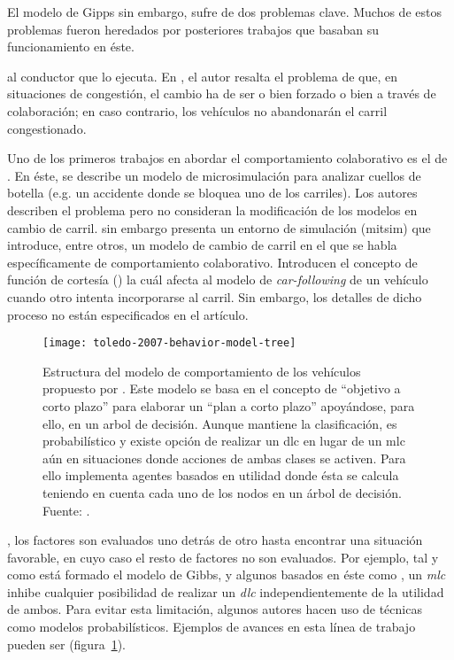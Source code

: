 El modelo de Gipps sin embargo, sufre de dos problemas clave. Muchos de estos problemas fueron heredados por posteriores trabajos que basaban su funcionamiento en éste.

 al conductor que lo ejecuta. En \cite{hidas2002modelling}, el autor resalta el problema de que, en situaciones de congestión, el cambio ha de ser o bien forzado o bien a través de colaboración; en caso contrario, los vehículos no abandonarán el carril congestionado.

Uno de los primeros trabajos en abordar el comportamiento colaborativo es el de \cite{Fritzsche1994}. En éste, se describe un modelo de microsimulación para analizar cuellos de botella (e.g. un accidente donde se bloquea uno de los carriles). Los autores describen el problema pero no consideran la modificación de los modelos en cambio de carril. \cite{Yang1996} sin embargo presenta un entorno de simulación (\gls{mitsim}) que introduce, entre otros, un modelo de cambio de carril en el que se habla específicamente de comportamiento colaborativo. Introducen el concepto de función de cortesía (\textit{}) la cuál afecta al modelo de \textit{\gls{car-following}} de un vehículo cuando otro intenta incorporarse al carril. Sin embargo, los detalles de dicho proceso no están especificados en el artículo.

\begin{figure}
	\texttt{[image: toledo-2007-behavior-model-tree]}
	\caption[Estructura del modelo de comportamiento propuesto por \cite{Toledo2007}]{Estructura del modelo de comportamiento de los vehículos propuesto por \cite{Toledo2007}. Este modelo se basa en el concepto de \enquote{objetivo a corto plazo} para elaborar un \enquote{plan a corto plazo} apoyándose, para ello, en un arbol de decisión. Aunque mantiene la clasificación, es probabilístico y existe opción de realizar un \Acrshort{dlc} en lugar de un \Acrshort{mlc} aún en situaciones donde acciones de ambas clases se activen. Para ello implementa agentes basados en utilidad donde ésta se calcula teniendo en cuenta cada uno de los nodos en un árbol de decisión. Fuente: \cite{Toledo2007}.}
	\label{fig:toledo-2007-behavior-model-tree}
\end{figure}

, los factores son evaluados uno detrás de otro hasta encontrar una situación favorable, en cuyo caso el resto de factores no son evaluados. Por ejemplo, tal y como está formado el modelo de Gibbs, y algunos basados en éste como \cite{Hidas2002}, un \textit{\Acrshort{mlc}} inhibe cualquier posibilidad de realizar un \textit{\Acrshort{dlc}} independientemente de la utilidad de ambos. Para evitar esta limitación, algunos autores hacen uso de técnicas como modelos probabilísticos. Ejemplos de avances en esta línea de trabajo pueden ser \cite{Toledo2003, Toledo2007, Wei2000} (figura~\ref{fig:toledo-2007-behavior-model-tree}).

